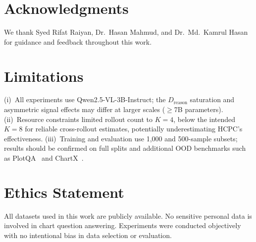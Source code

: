 \documentclass[11pt]{article}
\newcommand{\hcpc}{\textsc{HCPC}}
\begin{document}
\section*{Acknowledgments}
We thank Syed Rifat Raiyan, Dr.\ Hasan Mahmud, and Dr.\ Md.\ Kamrul Hasan for
guidance and feedback throughout this work.

\section*{Limitations}
(i)~All experiments use Qwen2.5-VL-3B-Instruct; the $D_\text{reason}$ saturation
and asymmetric signal effects may differ at larger scales ($\ge$7B parameters).
(ii)~Resource constraints limited rollout count to $K = 4$, below the intended
$K = 8$ for reliable cross-rollout estimates, potentially underestimating \hcpc{}'s
effectiveness.
(iii)~Training and evaluation use 1{,}000 and 500-sample subsets; results should
be confirmed on full splits and additional OOD benchmarks such as PlotQA~\citep{plotqa}
and ChartX~\citep{chartx2024}.

\section*{Ethics Statement}
All datasets used in this work are publicly available.
No sensitive personal data is involved in chart question answering.
Experiments were conducted objectively with no intentional bias in data
selection or evaluation.


\end{document}
